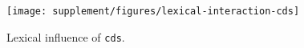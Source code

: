\begin{figure}[b]
  \centering

  \texttt{[image: supplement/figures/lexical-interaction-cds]}

  \caption{Lexical influence of \texttt{cds}.}
  \label{fig:lexical-cds}
\end{figure}
